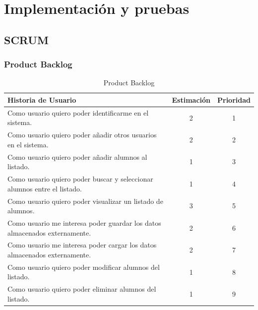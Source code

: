 \chapter{Implementación y pruebas}
\section{SCRUM}
\subsection{Product Backlog}
\begin{table}[h!]
	\centering
	\begin{tabular}{lcc}
		\toprule
		\textbf{Historia de Usuario} & \textbf{Estimación} & \textbf{Prioridad} \\
		\midrule
		Como usuario quiero poder identificarme en el sistema.	& 2	& 1 \\
		Como usuario quiero poder añadir otros usuarios en el sistema. & 2 &2 \\
		Como usuario quiero poder añadir alumnos al listado. & 1 & 3 \\
		Como usuario quiero poder buscar y seleccionar alumnos entre el listado. & 1 & 4 \\
		Como usuario quiero poder visualizar un listado de alumnos. & 3 & 5 \\
		Como usuario me interesa poder guardar los datos almacenados externamente. & 2 &6 \\
		Como usuario me interesa poder cargar los datos almacenados externamente. & 2 & 7 \\
		Como usuario quiero poder modificar alumnos del listado. &	1&	8 \\
		Como usuario quiero poder eliminar alumnos del listado.	 & 1 &	9 \\
		\bottomrule
\end{tabular}
\caption{\label{tab:product_backlog}Product Backlog}
\end{table}

\newpage
